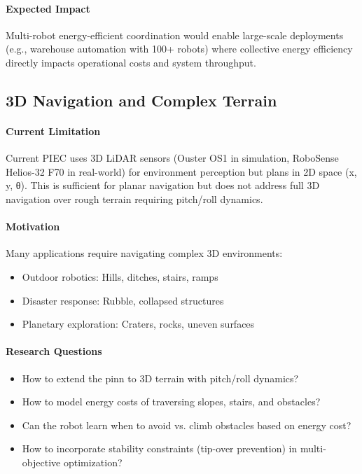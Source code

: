 \paragraph{Expected Impact}
Multi-robot energy-efficient coordination would enable large-scale deployments (e.g., warehouse automation with 100+ robots) where collective energy efficiency directly impacts operational costs and system throughput.

\subsection{3D Navigation and Complex Terrain}

\paragraph{Current Limitation}
Current PIEC uses 3D LiDAR sensors (Ouster OS1 in simulation, RoboSense Helios-32 F70 in real-world) for environment perception but plans in 2D space (x, y, θ). This is sufficient for planar navigation but does not address full 3D navigation over rough terrain requiring pitch/roll dynamics.

\paragraph{Motivation}
Many applications require navigating complex 3D environments:
\begin{itemize}
    \item Outdoor robotics: Hills, ditches, stairs, ramps
    \item Disaster response: Rubble, collapsed structures
    \item Planetary exploration: Craters, rocks, uneven surfaces
\end{itemize}

\paragraph{Research Questions}
\begin{itemize}
    \item How to extend the \acrshort{pinn} to 3D terrain with pitch/roll dynamics?
    \item How to model energy costs of traversing slopes, stairs, and obstacles?
    \item Can the robot learn when to avoid vs. climb obstacles based on energy cost?
    \item How to incorporate stability constraints (tip-over prevention) in multi-objective optimization?
\end{itemize}

